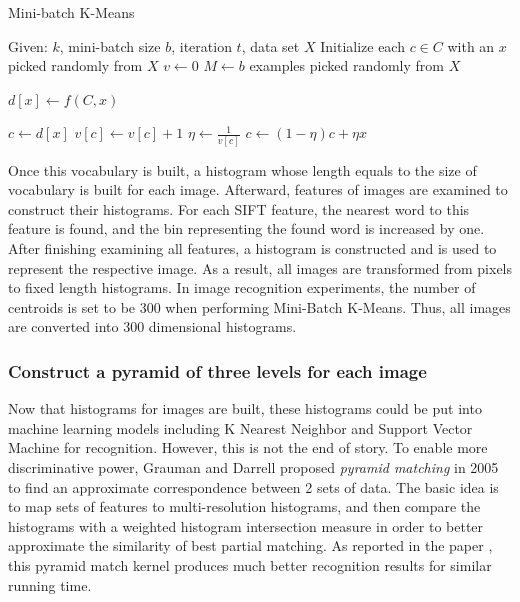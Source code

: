 \begin{algorithm}
  \caption{Mini-batch K-Means}
  \begin{algorithmic}[1]
  \State Given: $k$, mini-batch size $b$, iteration $t$, data set $X$
  \State Initialize each $c \in C$ with an $x$ picked randomly from $X$
  \State $v \gets 0$
  \State $M \gets b$ examples picked randomly from $X$
  
  \State $d[x] \gets f(C, x)$ 
  \EndFor

  \State $c \gets d[x]$ 
  \State $v[c] \gets v[c] + 1$ 
  \State $\eta \gets \frac{1}{v[c]}$ 
  \State $c \gets (1 - \eta)c + \eta x$ 
  \EndFor
  
  \EndFor
  \end{algorithmic}
\end{algorithm}

\noindent Once this vocabulary is built, a histogram whose length equals to the size of vocabulary is built for each image. Afterward, features of images are examined to construct their histograms. For each SIFT feature, the nearest word to this feature is found, and the bin representing the found word is increased by one. After finishing examining all features, a histogram is constructed and is used to represent the respective image. As a result, all images are transformed from pixels to fixed length histograms. In image recognition experiments, the number of centroids is set to be 300 when performing Mini-Batch K-Means. Thus, all images are converted into 300 dimensional histograms. 

\subsubsection{Construct a pyramid of three levels for each image}
Now that histograms for images are built, these histograms could be put into machine learning models including K Nearest Neighbor and Support Vector Machine for recognition. However, this is not the end of story. To enable more discriminative power, Grauman and Darrell \cite{grauman2005pyramid} proposed {\em pyramid matching} in 2005 to find an approximate correspondence between 2 sets of data. The basic idea is to map sets of features to multi-resolution histograms, and then compare the histograms with a weighted histogram intersection measure in order to better approximate the similarity of best partial matching. As reported in the paper \cite{grauman2005pyramid}, this pyramid match kernel produces much better recognition results for similar running time. \\

